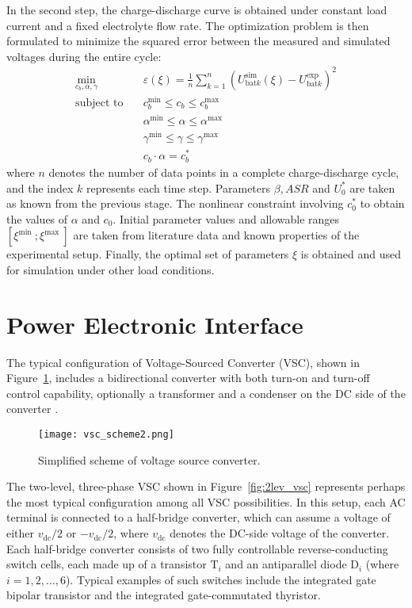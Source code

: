 In the second step, the charge-discharge curve is obtained under constant load current and a fixed electrolyte flow rate. The optimization problem is then formulated to minimize the squared error between the measured and simulated voltages during the entire cycle:
\begin{equation}
\begin{aligned}
\min_{c_b, \alpha, \gamma} \quad & \varepsilon(\xi) = \frac{1}{n} \sum_{k=1}^{n} \left(U^{\text{sim}}_{\text{bat}k}(\xi) - U^{\text{exp}}_{\text{bat}k}\right)^2 \\
\text{subject to} \quad & c_b^{\min} \leq c_b \leq c_b^{\max} \\
& \alpha^{\min} \leq \alpha \leq \alpha^{\max} \\
& \gamma^{\min} \leq \gamma \leq \gamma^{\max} \\
& c_b \cdot \alpha = c_b^{*}
\end{aligned}
\end{equation}
where $n$ denotes the number of data points in a complete charge-discharge cycle, and the index $k$ represents each time step. Parameters $\beta, A S R$ and $U_0^*$ are taken as known from the previous stage.  The nonlinear constraint involving $c_0^*$ to obtain the values of $\alpha$ and $c_0$.  Initial parameter values and allowable ranges $\left[\xi^{\text {min }} ; \xi^{\text {max }}\right]$ are taken from literature data and known properties of the experimental setup. Finally, the optimal set of parameters $\xi$ is obtained and used for simulation under other load conditions.

\section{Power Electronic Interface}\label{sec:ch3/sec2}
The typical configuration of Voltage-Sourced Converter (VSC), shown in Figure~\cref{fig:vsc_scheme}, includes a bidirectional converter with both turn-on and turn-off control capability, optionally a transformer and a condenser on the DC side of the converter \autocite{Milano_2019_ess}. 

\begin{figure}[htbp]
    \centering
    \texttt{[image: vsc\_scheme2.png]}
    \caption{Simplified scheme of voltage source converter.}
    \label{fig:vsc_scheme}
\end{figure}

The two-level, three-phase VSC shown in Figure~\cref{fig:2lev_vsc} represents perhaps the most typical configuration among all VSC possibilities. In this setup, each AC terminal is connected to a half-bridge converter, which can assume a voltage of either $v_{\mathrm{dc}} / 2$ or $-v_{\mathrm{dc}} / 2$, where $v_{\mathrm{dc}}$ denotes the DC-side voltage of the converter. Each half-bridge converter consists of two fully controllable reverse-conducting switch cells, each made up of a transistor $\mathrm{T}_i$ and an antiparallel diode $\mathrm{D}_i$ (where $i=1,2,\ldots,6$). Typical examples of such switches include the integrated gate bipolar transistor and the integrated gate-commutated thyristor.

